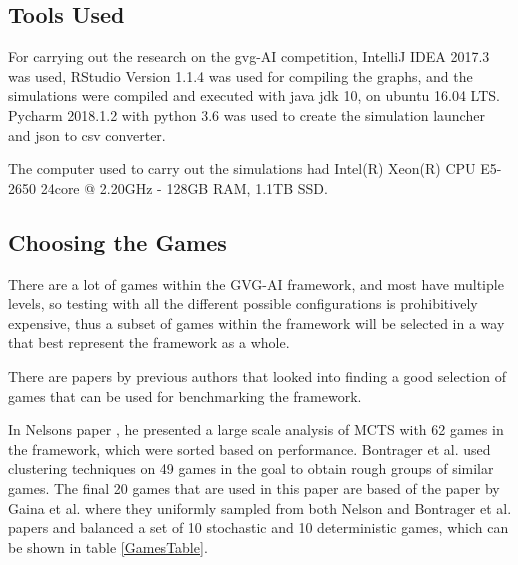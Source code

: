 \documentclass[journal]{IEEEtran}
\begin{document}
	





	\subsection{Tools Used}
	For carrying out the research on the gvg-AI competition, IntelliJ IDEA 2017.3 was used, RStudio Version 1.1.4 was used for compiling the graphs, and the simulations were compiled and executed with java jdk 10, on ubuntu 16.04 LTS.
	Pycharm 2018.1.2 with python 3.6 was used to create the simulation launcher and json to csv converter.
	
	The computer used to carry out the simulations had Intel(R) Xeon(R) CPU E5-2650 24core @ 2.20GHz - 128GB RAM, 1.1TB SSD.

	\subsection{Choosing the Games}
	
	There are a lot of games within the GVG-AI framework, and most have multiple levels, so testing with all the different possible configurations is prohibitively expensive, thus a subset of games within the framework will be selected in a way that best represent the framework as a whole.
	
	There are papers by previous authors that looked into finding a good selection of games that can be used for benchmarking the framework. \cite{gaina2017population}
	
	In Nelsons paper \cite{nelson2016investigating}, he presented a large scale analysis of MCTS with 62 games in the framework, which were sorted based on performance. Bontrager et al. \cite{bontrager2016matching} used clustering techniques on 49 games in the goal to obtain rough groups of similar games.
	The final 20 games that are used in this paper are based of the paper by Gaina et al. \cite{gaina2017population} where they uniformly sampled from both Nelson and Bontrager et al. papers and balanced a set of 10 stochastic and 10 deterministic games, which can be shown in table \ref{GamesTable}.
	
\end{document}
